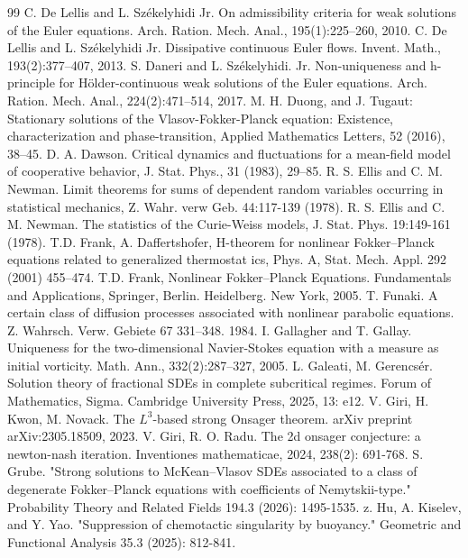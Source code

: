 \documentclass[10pt,a4paper]{amsart}
\numberwithin{equation}{section}
\begin{document}
\begin{thebibliography}{99}
 C. De Lellis and L. Sz{\'e}kelyhidi Jr. On admissibility criteria for weak solutions of the Euler equations. Arch. Ration. Mech. Anal., 195(1):225–260, 2010.
 C. De Lellis and L. Sz{\'e}kelyhidi Jr. Dissipative continuous Euler flows. Invent. Math., 193(2):377–407, 2013.
 S. Daneri and L. Sz\'ekelyhidi. Jr. Non-uniqueness and h-principle for H\"older-continuous weak solutions of the Euler equations. Arch. Ration. Mech. Anal., 224(2):471–514, 2017.
 M. H. Duong, and J. Tugaut: Stationary solutions of the Vlasov-Fokker-Planck equation: Existence, characterization and phase-transition, Applied Mathematics Letters, 52 (2016), 38–45.
 D. A. Dawson. Critical dynamics and fluctuations for a mean-field model of cooperative behavior, J. Stat. Phys., 31 (1983), 29–85.
 R. S. Ellis and C. M. Newman. Limit theorems for sums of dependent random variables occurring in statistical mechanics, Z. Wahr. verw Geb. 44:117-139 (1978).
 R. S. Ellis and C. M. Newman. The statistics of the Curie-Weiss models, J. Stat. Phys. 19:149-161 (1978).
 T.D. Frank, A. Daffertshofer, H-theorem for nonlinear Fokker–Planck equations related to generalized thermostat ics, Phys. A, Stat. Mech. Appl. 292 (2001) 455–474.
 T.D. Frank, Nonlinear Fokker–Planck Equations. Fundamentals and Applications, Springer, Berlin. Heidelberg. New York, 2005.
 T. Funaki. A certain class of diffusion processes associated with nonlinear parabolic equations. Z. Wahrsch. Verw. Gebiete 67 331–348. 1984.
 I. Gallagher and T. Gallay. Uniqueness for the two-dimensional Navier-Stokes equation with a measure as initial vorticity. Math. Ann., 332(2):287–327, 2005.
 L. Galeati, M. Gerencs\'er. Solution theory of fractional SDEs in complete subcritical regimes. Forum of Mathematics, Sigma. Cambridge University Press, 2025, 13: e12.
 V. Giri, H. Kwon, M. Novack. The $ L^ 3$-based strong Onsager theorem. arXiv preprint arXiv:2305.18509, 2023.
 V. Giri, R. O. Radu. The 2d onsager conjecture: a newton-nash iteration. Inventiones mathematicae, 2024, 238(2): 691-768.
 S. Grube. "Strong solutions to McKean–Vlasov SDEs associated to a class of degenerate Fokker–Planck equations with coefficients of Nemytskii-type." Probability Theory and Related Fields 194.3 (2026): 1495-1535.
 z. Hu, A. Kiselev, and Y. Yao. "Suppression of chemotactic singularity by buoyancy." Geometric and Functional Analysis 35.3 (2025): 812-841.

\end{thebibliography}
\end{document}
